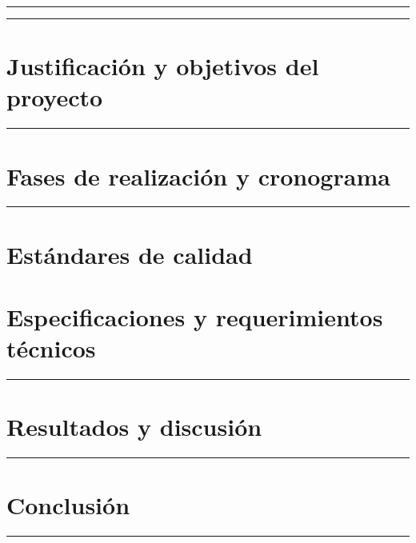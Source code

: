 \documentclass[a4paper,11pt]{article}
\begin{document}
\thispagestyle{empty}
\renewcommand{\listtablename}{Índice de tablas}
\listoftables
{\color{tfgazul}\rule{\textwidth}{3pt}}

\newpage
\thispagestyle{empty}
\mbox{}
\newpage

\thispagestyle{empty}
\renewcommand{\lstlistlistingname}{Índice del código}
\lstlistoflistings
{\color{tfgazul}\rule{\textwidth}{3pt}}

\newpage
\thispagestyle{empty}
\mbox{}
\newpage

\section{Justificación y objetivos del proyecto}
{\color{tfgazul}\rule{\textwidth}{3pt}}


\newpage
\section{Fases de realización y cronograma}
{\color{tfgazul}\rule{\textwidth}{3pt}}


\newpage
\section{Estándares de calidad}


\newpage
\section{Especificaciones y requerimientos técnicos}
{\color{tfgazul}\rule{\textwidth}{3pt}}


\newpage
\section{Resultados y discusión}
{\color{tfgazul}\rule{\textwidth}{3pt}}


\newpage
\section{Conclusión}
{\color{tfgazul}\rule{\textwidth}{3pt}}


\newpage
\end{document}
